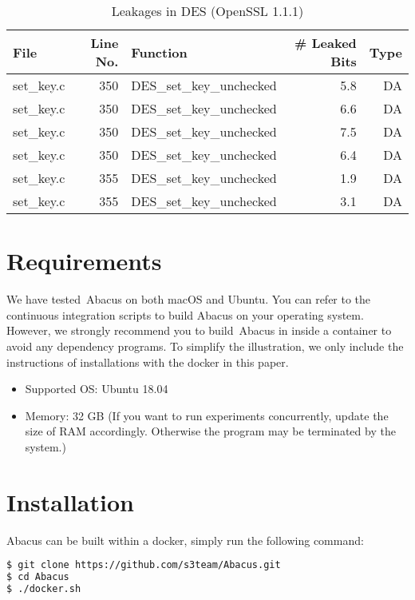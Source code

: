 \documentclass[10pt,conference]{IEEEtran}
\newcommand{\tool}{\textsf{Abacus}}
\begin{document}
\begin{table}[h!]
\centering\tiny\scriptsize
\caption{Leakages in DES (OpenSSL 1.1.1)}\label{tab:DESOpenSSL1.1.1}
\begin{tabular}{lrlrr}
\hline
\textbf{File} & \textbf{Line No.} & \textbf{Function} & \textbf{\# Leaked Bits} & \textbf{Type} \\\hline
set\_key.c& 350&DES\_set\_key\_unchecked&5.8 &DA\\
set\_key.c& 350&DES\_set\_key\_unchecked&6.6 &DA\\
set\_key.c& 350&DES\_set\_key\_unchecked&7.5 &DA\\
set\_key.c& 350&DES\_set\_key\_unchecked&6.4 &DA\\
set\_key.c& 355&DES\_set\_key\_unchecked&1.9 &DA\\
set\_key.c& 355&DES\_set\_key\_unchecked&3.1 &DA\\
\hline
\end{tabular}
\renewcommand{\baselinestretch}{1.0}\selectfont
\end{table}

\section{Requirements}
We have tested~\tool{} on both macOS and Ubuntu. You can refer to the continuous integration scripts to build Abacus on your operating system. However, we strongly recommend you to build~\tool{} in inside a container to avoid any dependency programs. To simplify the illustration, we only include the instructions of installations with the docker in this paper.
\begin{itemize}
\item Supported OS: Ubuntu 18.04
\item Memory: 32 GB (If you want to run experiments concurrently, update the size of RAM
     accordingly. Otherwise the program may be terminated by the system.)
\end{itemize}

\section{Installation}

\tool{} can be built within a docker, simply run the following command:

\begin{lstlisting}[language=bash]
$ git clone https://github.com/s3team/Abacus.git
$ cd Abacus
$ ./docker.sh
\end{lstlisting}
\end{document}
